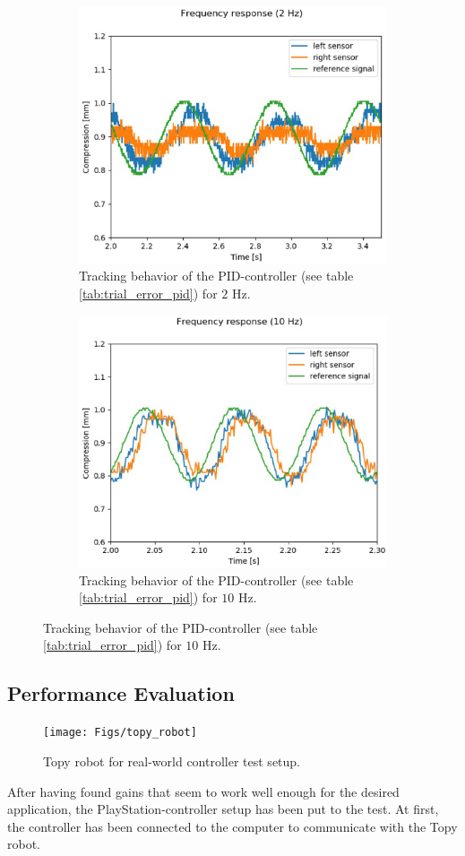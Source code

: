 \begin{figure}[h!]
    \centering
    \begin{minipage}{0.45\textwidth}
        \begin{figure}[H]
        	\centering
        	\includegraphics[width=0.6\linewidth]{Figs/2plot_zoom_PID}
        	\caption{Tracking behavior of the PID-controller (see table \ref{tab:trial_error_pid}) for $2$ Hz.}
        	\label{fig:2plot_zoom_PID}
        \end{figure}
    \end{minipage}
    \begin{minipage}{0.45\textwidth}
        \begin{figure}[H]
        	\centering
        	\includegraphics[width=0.6\linewidth]{Figs/10plot_zoom_PID}
        	\caption{Tracking behavior of the PID-controller (see table \ref{tab:trial_error_pid}) for $10$ Hz.}
        	\label{fig:10plot_zoom_PID}
        \end{figure}
    \end{minipage}
\end{figure}


\subsection{Performance Evaluation}
\begin{figure}[h!]
	\centering
	\texttt{[image: Figs/topy\_robot]}
	\caption{Topy robot for real-world controller test setup.}
	\label{fig:topy_robot}
\end{figure}
After having found gains that seem to work well enough for the desired application, the PlayStation-controller setup has been put to the test. At first, the controller has been connected to the computer to communicate with the Topy robot. 


